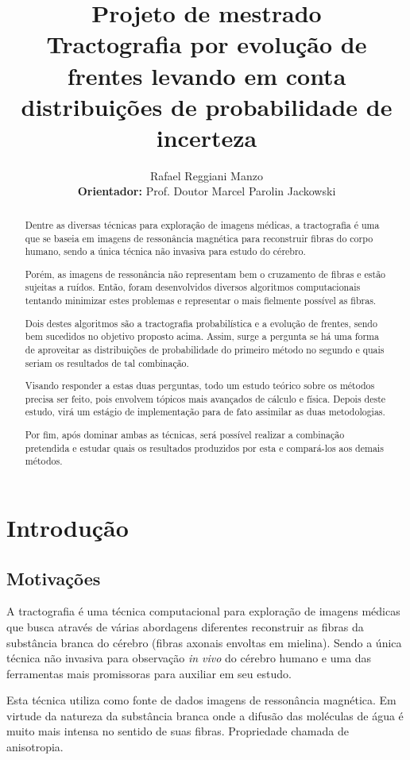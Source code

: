 \documentclass[a4paper,11pt]{report}
\title{Projeto de mestrado\\
       \textbf{Tractografia por evolução de frentes levando em conta distribuições de probabilidade de incerteza}}
\author{Rafael Reggiani Manzo\\
        \textbf{Orientador:} Prof. Doutor Marcel Parolin Jackowski}
\begin{document}
\maketitle
\tableofcontents

\begin{abstract}
Dentre as diversas técnicas para exploração de imagens médicas, a tractografia é uma que se baseia em imagens de ressonância magnética para reconstruir fibras do corpo humano, sendo a única técnica não invasiva para estudo do cérebro.

Porém, as imagens de ressonância não representam bem o cruzamento de fibras e estão sujeitas a ruídos. Então, foram desenvolvidos diversos algoritmos computacionais tentando minimizar estes problemas e representar o mais fielmente possível as fibras.

Dois destes algoritmos são a tractografia probabilística e a evolução de frentes, sendo bem sucedidos no objetivo proposto acima. Assim, surge a pergunta se há uma forma de aproveitar as distribuições de probabilidade do primeiro método no segundo e quais seriam os resultados de tal combinação.

Visando responder a estas duas perguntas, todo um estudo teórico sobre os métodos precisa ser feito, pois envolvem tópicos mais avançados de cálculo e física. Depois deste estudo, virá um estágio de implementação para de fato assimilar as duas metodologias.

Por fim, após dominar ambas as técnicas, será possível realizar a combinação pretendida e estudar quais os resultados produzidos por esta e compará-los aos demais métodos.
\end{abstract}

\chapter{Introdução}
  \section{Motivações}
  A tractografia é uma técnica computacional para exploração de imagens médicas que busca através de várias abordagens diferentes reconstruir as fibras da substância branca do cérebro (fibras axonais envoltas em mielina). Sendo a única técnica não invasiva para observação \textit{in vivo} do cérebro humano e uma das ferramentas mais promissoras para auxiliar em seu estudo.
  
  Esta técnica utiliza como fonte de dados imagens de ressonância magnética. Em virtude da natureza da substância branca onde a difusão das moléculas de água é muito mais intensa no sentido de suas fibras. Propriedade chamada de anisotropia.
  
\end{document}
